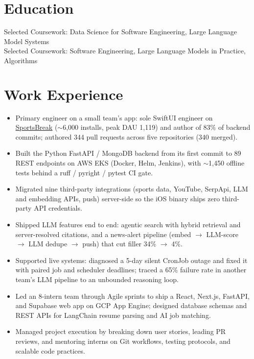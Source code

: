 \documentclass[11pt, letterpaper]{article}
\begin{document}

\section{Education}
Selected Coursework: Data Science for Software Engineering, Large Language Model Systems\\[1pt]
Selected Coursework: Software Engineering, Large Language Models in Practice, Algorithms

\section{Work Experience}
\begin{itemize}
  \item Primary engineer on a small team's app: sole SwiftUI engineer on \href{https://apps.apple.com/app/id6762649287}{SportsBreak} ($\sim$6{,}000 installs, peak DAU 1{,}119) and author of 83\% of backend commits; authored 344 pull requests across five repositories (340 merged).
  \item Built the Python FastAPI / MongoDB backend from its first commit to 89 REST endpoints on AWS EKS (Docker, Helm, Jenkins), with $\sim$1{,}450 offline tests behind a ruff / pyright / pytest CI gate.
  \item Migrated nine third-party integrations (sports data, YouTube, SerpApi, LLM and embedding APIs, push) server-side so the iOS binary ships zero third-party API credentials.
  \item Shipped LLM features end to end: agentic search with hybrid retrieval and server-resolved citations, and a news-alert pipeline (embed $\to$ LLM-score $\to$ LLM dedupe $\to$ push) that cut filler 34\% $\to$ 4\%.
  \item Supported live systems: diagnosed a 5-day silent CronJob outage and fixed it with paired job and scheduler deadlines; traced a 65\% failure rate in another team's LLM pipeline to an unbounded reasoning loop.
\end{itemize}

\begin{itemize}
  \item Led an 8-intern team through Agile sprints to ship a React, Next.js, FastAPI, and Supabase web app on GCP App Engine; designed database schemas and REST APIs for LangChain resume parsing and AI job matching.
  \item Managed project execution by breaking down user stories, leading PR reviews, and mentoring interns on Git workflows, testing protocols, and scalable code practices.
\end{itemize}
\end{document}
